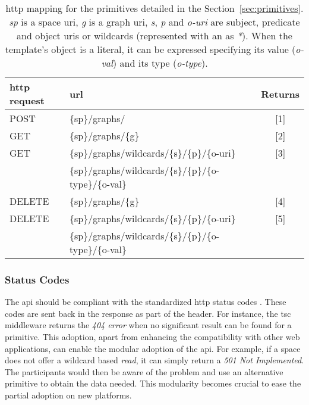 \begin{table} %
  \centering
  \caption {
    \acs{http} mapping for the primitives detailed in the Section~\ref{sec:primitives}. \textit{sp} is a space \acs{uri},
    \textit{g} is a graph \acs{uri}, \textit{s}, \textit{p} and \textit{o-uri} are subject, predicate and object \acsp{uri} or wildcards (represented with an as \textit{*}).
    When the template's object is a literal, it can be expressed specifying its value (\textit{o-val}) and its type (\textit{o-type}).
    \medskip
  }
  \begin{tabular}{llc}
      \hline
      \acs{http} request & \acs{url} & Returns \\
      \hline
      POST & \{sp\}/graphs/ & [1] \\
      GET & \{sp\}/graphs/\{g\} & [2] \\
      GET & \{sp\}/graphs/wildcards/\{s\}/\{p\}/\{o-uri\} & [3] \\
      & \{sp\}/graphs/wildcards/\{s\}/\{p\}/\{o-type\}/\{o-val\} & \\
      DELETE & \{sp\}/graphs/\{g\} & [4] \\
      DELETE & \{sp\}/graphs/wildcards/\{s\}/\{p\}/\{o-uri\} & [5] \\
      & \{sp\}/graphs/wildcards/\{s\}/\{p\}/\{o-type\}/\{o-val\} & \\
      \hline
  \end{tabular}
  \label{tab:tscAPI}
\end{table}


\subsubsection{Status Codes}
\label{sec:status_codes}
The \acs{api} should be compliant with the standardized \acs{http} status codes .
These codes are sent back in the response as part of the header.
For instance, the \ac{tsc} middleware returns the \emph{404 error} when no significant result can be found for a primitive.
This adoption, apart from enhancing the compatibility with other web applications, can enable the modular adoption of the \ac{api}.
For example, if a space does not offer a wildcard based \textit{read}, it can simply return a \emph{501 Not Implemented}.
The participants would then be aware of the problem and use an alternative primitive to obtain the data needed.
This modularity becomes crucial to ease the partial adoption on new platforms.


